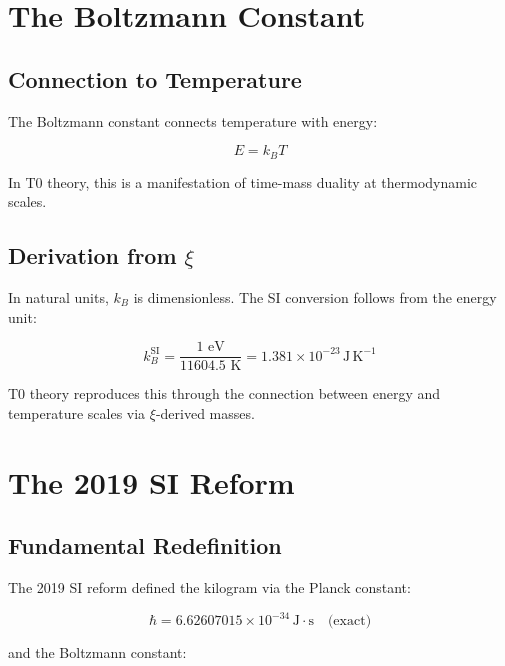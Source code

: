 \section{The Boltzmann Constant}

\subsection{Connection to Temperature}

The Boltzmann constant connects temperature with energy:

\begin{equation}
	E = k_B T
	\label{eq:boltzmann_relation}
\end{equation}

In T0 theory, this is a manifestation of time-mass duality at thermodynamic scales.

\subsection{Derivation from $\xi$}

In natural units, $k_B$ is dimensionless. The SI conversion follows from the 
energy unit:

\begin{equation}
	k_B^{\text{SI}} = \frac{\text{1 eV}}{\text{11604.5 K}} = 1.381 \times 10^{-23}\,\text{J}\,\text{K}^{-1}
	\label{eq:boltzmann_si}
\end{equation}

T0 theory reproduces this through the connection between energy and temperature 
scales via $\xi$-derived masses.

\section{The 2019 SI Reform}

\subsection{Fundamental Redefinition}

The 2019 SI reform defined the kilogram via the Planck constant:

\begin{equation}
	\hbar = 6.62607015 \times 10^{-34}\,\text{J}\cdot\text{s} \quad \text{(exact)}
	\label{eq:planck_const_exact}
\end{equation}

and the Boltzmann constant:

